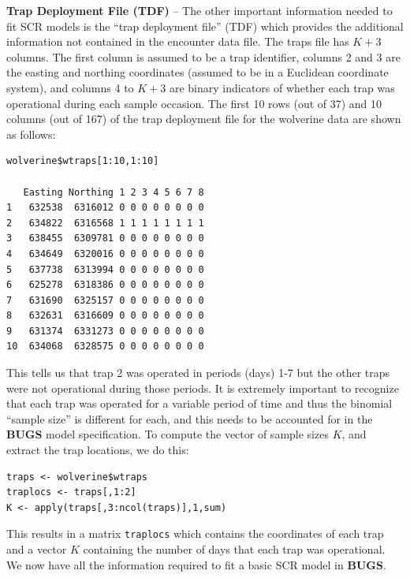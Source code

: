 {\flushleft \bf Trap Deployment File (TDF)} -- The other important
information needed to fit SCR models is the ``trap deployment file''
(TDF) which provides the additional information not contained in the
encounter data file. The traps file has $K + 3$ columns. The first
column is assumed to be a trap identifier, columns 2 and 3 are the
easting and northing coordinates (assumed to be in a Euclidean
coordinate system), and columns 4 to $K + 3$ are binary indicators of
whether each trap was operational during each sample occasion. The
first 10 rows (out of 37) and 10 columns (out of 167) of the trap
deployment file for the wolverine data are shown as follows:
{\small
\begin{verbatim}
wolverine$wtraps[1:10,1:10]

   Easting Northing 1 2 3 4 5 6 7 8
1   632538  6316012 0 0 0 0 0 0 0 0
2   634822  6316568 1 1 1 1 1 1 1 1
3   638455  6309781 0 0 0 0 0 0 0 0
4   634649  6320016 0 0 0 0 0 0 0 0
5   637738  6313994 0 0 0 0 0 0 0 0
6   625278  6318386 0 0 0 0 0 0 0 0
7   631690  6325157 0 0 0 0 0 0 0 0
8   632631  6316609 0 0 0 0 0 0 0 0
9   631374  6331273 0 0 0 0 0 0 0 0
10  634068  6328575 0 0 0 0 0 0 0 0
\end{verbatim}
}
This tells us that trap 2 was operated in periods (days) 1-7 but the
other traps were not operational during those periods. It is extremely
important to recognize that each trap was operated for a variable
period of time and thus the binomial ``sample size'' is different for
each, and this needs to be accounted for in the {\bf BUGS} model
specification.  To compute the vector of sample sizes $K$, and extract
the trap locations, we do this:
\begin{verbatim}
traps <- wolverine$wtraps
traplocs <- traps[,1:2]
K <- apply(traps[,3:ncol(traps)],1,sum)
\end{verbatim}
This results in a matrix \mbox{\tt traplocs} which contains the
coordinates of each trap and a vector $K$ containing the number of
days that each trap was operational. We now have all the information
required to fit a basic SCR model in {\bf BUGS}.



